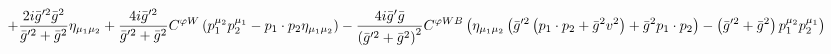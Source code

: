 %
\begin{dmath*}
%
  +  \frac{2 i {\bar g}^{\prime 2} {\bar g}{}^2}{{\bar g}^{\prime 2} + {\bar g}{}^2}\eta_{\mu_1 \mu_2}  +  \frac{4 i {\bar g}^{\prime 2}}{{\bar g}^{\prime 2} + {\bar g}{}^2}C^{ \varphi  W} \left(p_1^{\mu_2} p_2^{\mu_1} - p_{1}\nobreak\cdot\nobreak{}p_{2} \eta_{\mu_1 \mu_2}\right)  -  \frac{4 i {\bar g}^\prime {\bar g}{}}{\left({\bar g}^{\prime 2} + {\bar g}{}^2\right)^2}C^{ \varphi  WB} \left(\eta_{\mu_1 \mu_2} \left({\bar g}^{\prime 2} \left(p_{1}\nobreak\cdot\nobreak{}p_{2} + {\bar g}{}^2 v^2\right) + {\bar g}{}^2 p_{1}\nobreak\cdot\nobreak{}p_{2}\right) - \left({\bar g}^{\prime 2} + {\bar g}{}^2\right) p_1^{\mu_2} p_2^{\mu_1}\right)
%
\end{dmath*}
%
